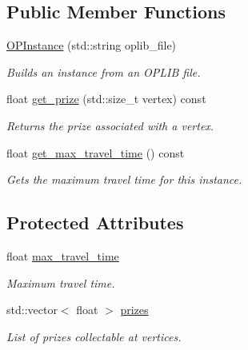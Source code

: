 \subsection*{Public Member Functions}
\begin{DoxyCompactItemize}
\item 
\hyperlink{classas_1_1oplib_1_1OPInstance_a6324297e7797771f734a0e373dc6d218}{O\+P\+Instance} (std\+::string oplib\+\_\+file)
\begin{DoxyCompactList}\small\item\em Builds an instance from an O\+P\+L\+IB file. \end{DoxyCompactList}\item 
float \hyperlink{classas_1_1oplib_1_1OPInstance_a7e641c06d51b916cdf6ae88a4510ee0b}{get\+\_\+prize} (std\+::size\+\_\+t vertex) const
\begin{DoxyCompactList}\small\item\em Returns the prize associated with a vertex. \end{DoxyCompactList}\item 
float \hyperlink{classas_1_1oplib_1_1OPInstance_a8b3d893ac260f673f43d5bc63f24dba1}{get\+\_\+max\+\_\+travel\+\_\+time} () const
\begin{DoxyCompactList}\small\item\em Gets the maximum travel time for this instance. \end{DoxyCompactList}\end{DoxyCompactItemize}
\subsection*{Protected Attributes}
\begin{DoxyCompactItemize}
\item 
float \hyperlink{classas_1_1oplib_1_1OPInstance_a57be40043f2881e6ba41d62ad6bd223c}{max\+\_\+travel\+\_\+time}
\begin{DoxyCompactList}\small\item\em Maximum travel time. \end{DoxyCompactList}\item 
std\+::vector$<$ float $>$ \hyperlink{classas_1_1oplib_1_1OPInstance_ae04b2b823f630159c31d7c3f2f3fcdb5}{prizes}
\begin{DoxyCompactList}\small\item\em List of prizes collectable at vertices. \end{DoxyCompactList}\end{DoxyCompactItemize}


